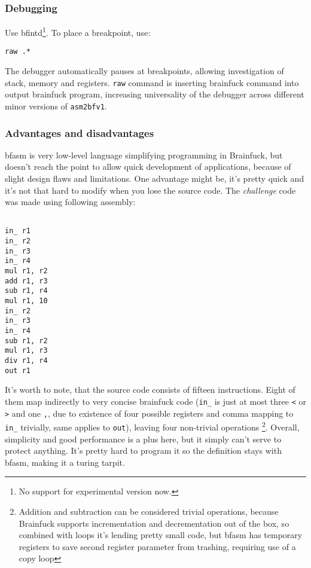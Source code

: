 \documentclass{article}
\begin{document}
\subsubsection{Debugging}
\par Use bfintd\footnote{No support for experimental version now.}. To place a breakpoint, use:

\begin{verbatim}
raw .*
\end{verbatim}

\par The debugger automatically pauses at breakpoints, allowing investigation of stack, memory and registers. \verb|raw| command is inserting brainfuck command into output brainfuck program, increasing universality of the debugger across different minor versions of \verb|asm2bfv1|.

\subsubsection{Advantages and disadvantages}
\par bfasm is very low-level language simplifying programming in Brainfuck, but doesn't reach the point to allow quick development of applications, because of slight design flaws and limitations. One advantage might be, it's pretty quick and it's not that hard to modify when you lose the source code. The \textit{challenge} code was made using following assembly:

\begin{verbatim}

in_ r1
in_ r2
in_ r3
in_ r4
mul r1, r2
add r1, r3
sub r1, r4
mul r1, 10
in_ r2
in_ r3
in_ r4
sub r1, r2
mul r1, r3
div r1, r4
out r1

\end{verbatim}

\par It's worth to note, that the source code consists of fifteen instructions. Eight of them map indirectly to very concise brainfuck code (\verb|in_| is just at most three \verb|<| or \verb|>| and one \verb|,|, due to existence of four possible registers and comma mapping to \verb|in_| trivially, same applies to \verb|out|), leaving four non-trivial operations \footnote{Addition and subtraction can be considered trivial operations, because Brainfuck supports incrementation and decrementation out of the box, so combined with loops it's lending pretty small code, but bfasm has temporary registers to save second register parameter from trashing, requiring use of a copy loop}. Overall, simplicity and good performance is a plus here, but it simply can't serve to protect anything. It's pretty hard to program it so the definition stays with bfasm, making it a turing tarpit.
\end{document}
